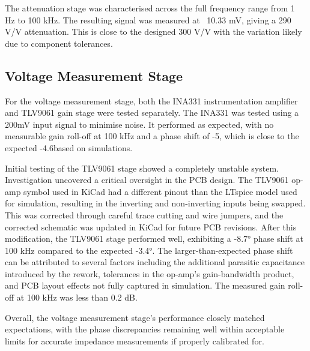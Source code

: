 The attenuation stage was characterised across the full frequency range from 1 Hz to 100 kHz. The resulting signal was measured at ~10.33 mV, giving a 290 V/V attenuation. This is close to the designed 300 V/V with the variation likely due to component tolerances.


\subsection{Voltage Measurement Stage} 
For the voltage measurement stage, both the INA331 instrumentation amplifier and TLV9061 gain stage were tested separately. The INA331 was tested using a 200mV input signal to minimise noise. It performed as expected, with no measurable gain roll-off at 100 kHz and a phase shift of -5\textdegree, which is close to the expected -4.6\textdegree based on simulations.

Initial testing of the TLV9061 stage showed a completely unstable system. Investigation uncovered a critical oversight in the PCB design. The TLV9061 op-amp symbol used in KiCad had a different pinout than the LTspice model used for simulation, resulting in the inverting and non-inverting inputs being swapped. This was corrected through careful trace cutting and wire jumpers, and the corrected schematic was updated in KiCad for future PCB revisions. After this modification, the TLV9061 stage performed well, exhibiting a -8.7° phase shift at 100 kHz compared to the expected -3.4°. The larger-than-expected phase shift can be attributed to several factors including the additional parasitic capacitance introduced by the rework, tolerances in the op-amp's gain-bandwidth product, and PCB layout effects not fully captured in simulation. The measured gain roll-off at 100 kHz was less than 0.2 dB. 

Overall, the voltage measurement stage's performance closely matched expectations, with the phase discrepancies remaining well within acceptable limits for accurate impedance measurements if properly calibrated for.

